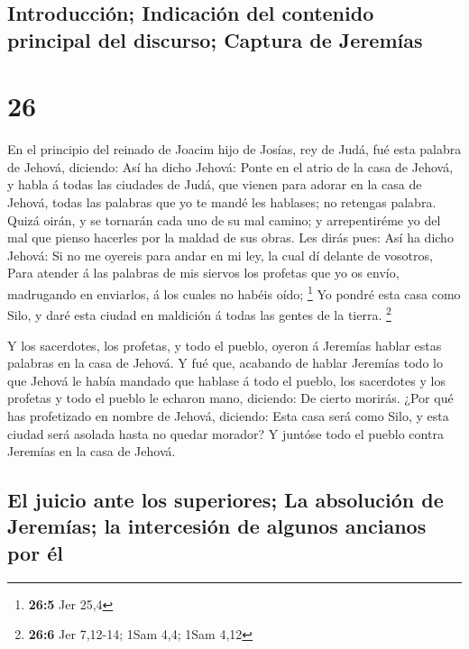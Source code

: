 \hypertarget{introducciuxf3n-indicaciuxf3n-del-contenido-principal-del-discurso-captura-de-jeremuxedas}{%
\subsection{Introducción; Indicación del contenido principal del
discurso; Captura de
Jeremías}\label{introducciuxf3n-indicaciuxf3n-del-contenido-principal-del-discurso-captura-de-jeremuxedas}}

\hypertarget{section-25}{%
\section{26}\label{section-25}}

 En el principio del reinado de Joacim hijo de Josías, rey
de Judá, fué esta palabra de Jehová, diciendo:  Así ha dicho
Jehová: Ponte en el atrio de la casa de Jehová, y habla á todas las
ciudades de Judá, que vienen para adorar en la casa de Jehová, todas las
palabras que yo te mandé les hablases; no retengas palabra. 
Quizá oirán, y se tornarán cada uno de su mal camino; y arrepentiréme yo
del mal que pienso hacerles por la maldad de sus obras.  Les
dirás pues: Así ha dicho Jehová: Si no me oyereis para andar en mi ley,
la cual dí delante de vosotros,  Para atender á las palabras
de mis siervos los profetas que yo os envío, madrugando en enviarlos, á
los cuales no habéis oído; \footnote{\textbf{26:5} Jer 25,4}
 Yo pondré esta casa como Silo, y daré esta ciudad en
maldición á todas las gentes de la tierra. \footnote{\textbf{26:6} Jer
  7,12-14; 1Sam 4,4; 1Sam 4,12}

 Y los sacerdotes, los profetas, y todo el pueblo, oyeron á
Jeremías hablar estas palabras en la casa de Jehová.  Y fué
que, acabando de hablar Jeremías todo lo que Jehová le había mandado que
hablase á todo el pueblo, los sacerdotes y los profetas y todo el pueblo
le echaron mano, diciendo: De cierto morirás.  ¿Por qué has
profetizado en nombre de Jehová, diciendo: Esta casa será como Silo, y
esta ciudad será asolada hasta no quedar morador? Y juntóse todo el
pueblo contra Jeremías en la casa de Jehová.

\hypertarget{el-juicio-ante-los-superiores-la-absoluciuxf3n-de-jeremuxedas-la-intercesiuxf3n-de-algunos-ancianos-por-uxe9l}{%
\subsection{El juicio ante los superiores; La absolución de Jeremías; la
intercesión de algunos ancianos por
él}\label{el-juicio-ante-los-superiores-la-absoluciuxf3n-de-jeremuxedas-la-intercesiuxf3n-de-algunos-ancianos-por-uxe9l}}

